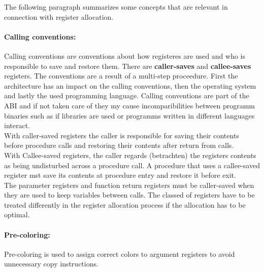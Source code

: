 \documentclass[a4paper,10pt]{article}
\begin{document}
The following paragraph summarizes some concepts that are relevant in connection with register allocation.

\paragraph{Calling conventions:} Calling conventions are conventions about how registeres are used and who is responsible to save and restore them. There are \textbf{caller-saves} and \textbf{callee-saves} registers. The conventions are a result of a multi-step proceedure. First the architecture has an impact on the calling conventions, then the operating system and lastly the used programming language. Calling conventions are part of the ABI and if not taken care of they my cause incomparibilities between programm binaries such as if libraries are used or programms written in different languages interact.\\
With caller-saved registers the caller is responsible for saving their contents before procedure calls and restoring their contents after return from calls.\\
With Callee-saved registers, the caller regards (betrachten) the registers contents as being undisturbed across a procedure call. A procedure that uses a callee-saved register mst save its contents at procedure entry and restore it before exit.\\
The parameter registers and function return registers must be caller-saved when they are used to keep variables between calls. The classed of registers have to be treated differently in the register allocation process if the allocation has to be optimal.


\paragraph{Pre-coloring:} Pre-coloring is used to assign correct colors to argument registers to avoid unnecessary copy instructions.
\end{document}
